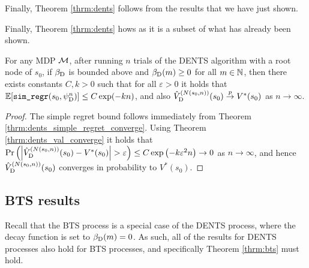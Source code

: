     Finally, Theorem \ref{thrm:dents} follows  from the results that we have just shown.


    Finally, Theorem \ref{thrm:dents} hows as it is a subset of what has already been shown.
    \begin{customthm}{4.2}
        For any MDP $\mathcal{M}$, after running $n$ trials of the DENTS algorithm with a root node of $s_0$, if ${\beta_{{\textnormal{D}}}}$ is bounded above and ${\beta_{{\textnormal{D}}}}(m)\geq 0$ for all $m\in\mathbb{N}$, then there exists constants $C,k>0$ such that for all $\varepsilon>0$ it holds that
        $\mathbb{E}[{\textnormal{\texttt{sim\_regr}}}(s_0,{\psi^{n}_{{\textnormal{D}}}})] \leq C\exp(-kn)$, and also ${\hat{V}^{(N(s_0,n))}_{{\textnormal{D}}}}(s_0) \overset{p}{\to} V^*(s_0)$ as $n\rightarrow\infty$.
    \end{customthm}
    \begin{proof}
        The simple regret bound follows immediately from Theorem \ref{thrm:dents_simple_regret_converge}. Using Theorem \ref{thrm:dents_val_converge} it holds that $\Pr\left(\left| {\hat{V}^{(N(s_{0},n))}_{{\textnormal{D}}}}(s_0) - V^*(s_0) \right| > \varepsilon \right) \leq C\exp\left( -k\varepsilon^2 n \right) \rightarrow 0$ as $n\rightarrow \infty$, and hence ${\hat{V}^{(N(s_{0},n))}_{{\textnormal{D}}}}(s_0)$ converges in probability to $V^*(s_0)$.
    \end{proof}
















    
\subsection{BTS results} \label{appsec:bts_proofs}

    Recall that the BTS process is a special case of the DENTS process, where the decay function is set to ${\beta_{{\textnormal{D}}}}(m)=0$. As such, all of the results for DENTS processes also hold for BTS processes, and specifically Theorem \ref{thrm:bts}  must hold.


